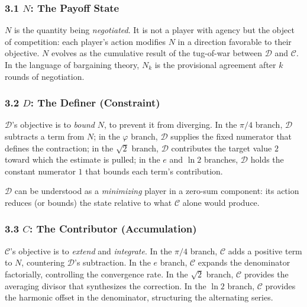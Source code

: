 \documentclass[12pt]{article}
\begin{document}
\subsubsection{\texorpdfstring{3.1 \(N\): The Payoff
State}{3.1 N: The Payoff State}}\label{n-the-payoff-state}

\(N\) is the quantity being \emph{negotiated}. It is not a player with
agency but the object of competition: each player's action modifies
\(N\) in a direction favorable to their objective. \(N\) evolves as the
cumulative result of the tug-of-war between \(\mathcal{D}\) and
\(\mathcal{C}\). In the language of bargaining theory, \(N_k\) is the
provisional agreement after \(k\) rounds of negotiation.

\subsubsection{\texorpdfstring{3.2 \(D\): The Definer
(Constraint)}{3.2 D: The Definer (Constraint)}}\label{d-the-definer-constraint}

\(\mathcal{D}\)'s objective is to \emph{bound} \(N\), to prevent it from
diverging. In the \(\pi/4\) branch, \(\mathcal{D}\) subtracts a term
from \(N\); in the \(\varphi\) branch, \(\mathcal{D}\) supplies the
fixed numerator that defines the contraction; in the \(\sqrt{2}\)
branch, \(\mathcal{D}\) contributes the target value \(2\) toward which
the estimate is pulled; in the \(e\) and \(\ln 2\) branches,
\(\mathcal{D}\) holds the constant numerator \(1\) that bounds each
term's contribution.

\(\mathcal{D}\) can be understood as a \emph{minimizing} player in a
zero-sum component: its action reduces (or bounds) the state relative to
what \(\mathcal{C}\) alone would produce.

\subsubsection{\texorpdfstring{3.3 \(C\): The Contributor
(Accumulation)}{3.3 C: The Contributor (Accumulation)}}\label{c-the-contributor-accumulation}

\(\mathcal{C}\)'s objective is to \emph{extend} and \emph{integrate}. In
the \(\pi/4\) branch, \(\mathcal{C}\) adds a positive term to \(N\),
countering \(\mathcal{D}\)'s subtraction. In the \(e\) branch,
\(\mathcal{C}\) expands the denominator factorially, controlling the
convergence rate. In the \(\sqrt{2}\) branch, \(\mathcal{C}\) provides
the averaging divisor that synthesizes the correction. In the \(\ln 2\)
branch, \(\mathcal{C}\) provides the harmonic offset in the denominator,
structuring the alternating series.
\end{document}
